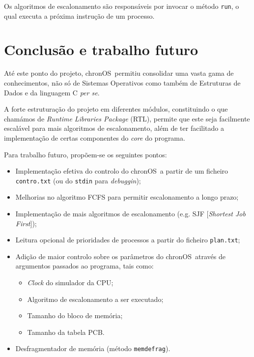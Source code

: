 \documentclass[a4paper,11pt,onecolumn,oneside]{article}
\newcommand{\chronOS}{\textsf{chronOS}}
\begin{document}
	Os algoritmos de escalonamento são responsáveis por invocar o método \verb|run|, o qual executa a próxima instrução de um processo.
	
	
	\section{Conclusão e trabalho futuro}
	\label{sec:con_futwork}
	
	Até este ponto do projeto, \chronOS~permitiu consolidar uma vasta gama de conhecimentos, não só de Sistemas Operativos como também de Estruturas de Dados e da linguagem C \textit{per se}.
	
	A forte estruturação do projeto em diferentes módulos, constituindo o que chamámos de \textit{Runtime Libraries Package} (RTL), permite que este seja facilmente escalável para mais algoritmos de escalonamento, além de ter facilitado a implementação de certas componentes do \textit{core} do programa.
	
	\vspace{0.6cm}
	
	Para trabalho futuro, propõem-se os seguintes pontos:
	
	\begin{itemize}
		\item Implementação efetiva do controlo do \chronOS~a partir de um ficheiro \texttt{contro.txt} (ou do \texttt{stdin} para \textit{debuggin});
		\item Melhorias no algoritmo FCFS para permitir escalonamento a longo prazo;
		\item Implementação de mais algoritmos de escalonamento (e.g. SJF [\textit{Shortest Job First}]);
		\item Leitura opcional de prioridades de processos a partir do ficheiro \texttt{plan.txt};
		\item Adição de maior controlo sobre os parâmetros do \chronOS~através de argumentos passados ao programa, tais como:
		\begin{itemize}
			\item \textit{Clock} do simulador da CPU;
			\item Algoritmo de escalonamento a ser executado;
			\item Tamanho do bloco de memória;
			\item Tamanho da tabela PCB.
		\end{itemize}
	
		\item Desfragmentador de memória (método \verb|memdefrag|).
	\end{itemize}
	
\end{document}
